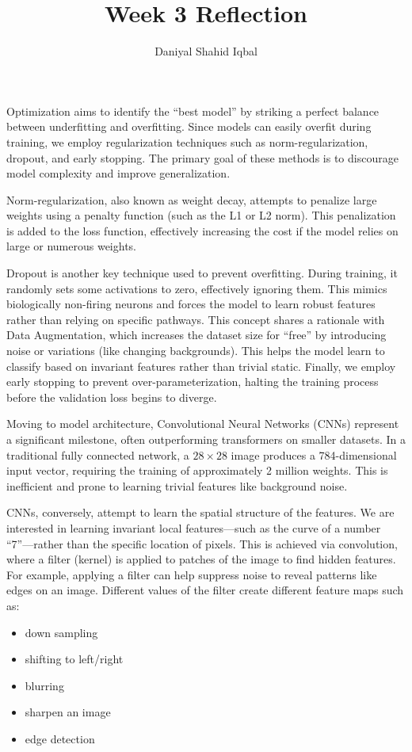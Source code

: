 \documentclass{article}
\title{Week 3 Reflection}
\author{Daniyal Shahid Iqbal}
\begin{document}
\maketitle
Optimization aims to identify the ``best model'' by striking a perfect balance between underfitting and overfitting. Since models can easily overfit during training, we employ regularization techniques such as norm-regularization, dropout, and early stopping. The primary goal of these methods is to discourage model complexity and improve generalization.

Norm-regularization, also known as weight decay, attempts to penalize large weights using a penalty function (such as the L1 or L2 norm). This penalization is added to the loss function, effectively increasing the cost if the model relies on large or numerous weights.

Dropout is another key technique used to prevent overfitting. During training, it randomly sets some activations to zero, effectively ignoring them. This mimics biologically non-firing neurons and forces the model to learn robust features rather than relying on specific pathways. This concept shares a rationale with Data Augmentation, which increases the dataset size for ``free'' by introducing noise or variations (like changing backgrounds). This helps the model learn to classify based on invariant features rather than trivial static. Finally, we employ early stopping to prevent over-parameterization, halting the training process before the validation loss begins to diverge.

Moving to model architecture, Convolutional Neural Networks (CNNs) represent a significant milestone, often outperforming transformers on smaller datasets. In a traditional fully connected network, a $28 \times 28$ image produces a 784-dimensional input vector, requiring the training of approximately 2 million weights. This is inefficient and prone to learning trivial features like background noise.

CNNs, conversely, attempt to learn the spatial structure of the features. We are interested in learning invariant local features—such as the curve of a number ``7''—rather than the specific location of pixels. This is achieved via convolution, where a filter (kernel) is applied to patches of the image to find hidden features. For example, applying a filter can help suppress noise to reveal patterns like edges on an image. Different values of the filter create different feature maps such as: 
\begin{itemize}
    \item down sampling 
    \item shifting to left/right
    \item blurring
    \item sharpen an image
    \item edge detection
\end{itemize}
\end{document}
